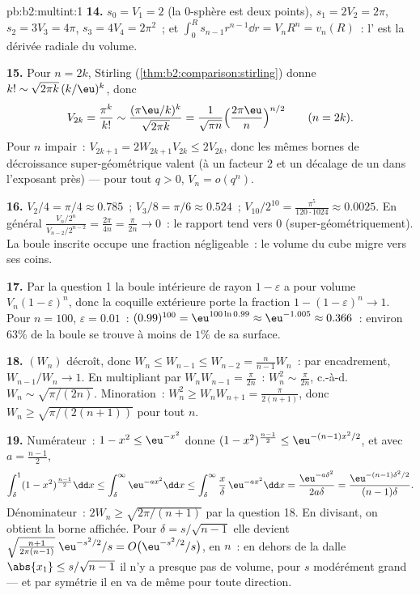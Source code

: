 \begin{solution}{pb:b2:multint:1}
\textbf{14.} $s_0 = V_1 = 2$ (la $0$-sphère est deux points),
$s_1 = 2V_2 = 2\pi$, $s_2 = 3V_3 = 4\pi$, $s_3 = 4V_4 =
2\pi^2$~; et $\int_0^R s_{n-1}r^{n-1}\dd r = V_nR^n =
v_n(R)$~: l' est la dérivée radiale du volume.

\textbf{15.} Pour $n = 2k$, Stirling
(\cref{thm:b2:comparison:stirling}) donne $k! \sim
\sqrt{2\pi k}\,(k/\eu)^k$, donc
\[
V_{2k} = \frac{\pi^k}{k!}
\sim \frac{(\pi\eu/k)^k}{\sqrt{2\pi k}}
= \frac1{\sqrt{\pi n}}\Bigl(\frac{2\pi\eu}n\Bigr)^{n/2}
\qquad (n = 2k).
\]
Pour $n$ impair~: $V_{2k+1} = 2W_{2k+1}V_{2k} \leq 2V_{2k}$, donc
les mêmes bornes de décroissance super-géométrique valent (à un facteur
$2$ et un décalage de un dans l'exposant près) --- pour tout $q >
0$, $V_n = o(q^n)$.

\textbf{16.} $V_2/4 = \pi/4 \approx 0.785$~; $V_3/8 = \pi/6
\approx 0.524$~; $V_{10}/2^{10} = \frac{\pi^5}{120\cdot1024}
\approx 0.0025$. En général $\frac{V_n/2^n}{V_{n-2}/2^{n-2}}
= \frac{2\pi}{4n} = \frac{\pi}{2n} \to 0$~: le rapport tend vers
$0$ (super-géométriquement). La boule inscrite occupe une
fraction négligeable~: le volume du cube migre vers ses
coins.

\textbf{17.} Par la question 1 la boule intérieure de rayon $1 -
\varepsilon$ a pour volume $V_n(1-\varepsilon)^n$, donc la coquille
extérieure porte la fraction $1 - (1 - \varepsilon)^n \to 1$.
Pour $n = 100$, $\varepsilon = 0.01$~: $(0.99)^{100} =
\eu^{100\ln0.99} \approx \eu^{-1.005} \approx 0.366$~: environ
$63\%$ de la boule se trouve à moins de $1\%$ de sa surface.

\textbf{18.} $(W_n)$ décroît, donc $W_n \leq W_{n-1} \leq
W_{n-2} = \frac{n}{n-1}W_n$~: par encadrement, $W_{n-1}/W_n \to 1$.
En multipliant par $W_nW_{n-1} = \frac\pi{2n}$~: $W_n^2 \sim
\frac\pi{2n}$, c.-à-d.\ $W_n \sim \sqrt{\pi/(2n)}$. Minoration~:
$W_n^2 \geq W_nW_{n+1} = \frac{\pi}{2(n+1)}$, donc $W_n \geq
\sqrt{\pi/(2(n+1))}$ pour tout $n$.

\textbf{19.} Numérateur~: $1 - x^2 \leq \eu^{-x^2}$ donne $(1 -
x^2)^{\frac{n-1}2} \leq \eu^{-(n-1)x^2/2}$, et avec $a =
\frac{n-1}2$,
\[
\int_\delta^1(1 - x^2)^{\frac{n-1}2}\dd x
\leq \int_\delta^\infty\eu^{-ax^2}\dd x
\leq \int_\delta^\infty\frac x\delta\,\eu^{-ax^2}\dd x
= \frac{\eu^{-a\delta^2}}{2a\delta}
= \frac{\eu^{-(n-1)\delta^2/2}}{(n-1)\delta}.
\]
Dénominateur~: $2W_n \geq \sqrt{2\pi/(n+1)}$ par la question 18.
En divisant, on obtient la borne affichée. Pour $\delta =
s/\sqrt{n-1}$ elle devient
$\sqrt{\tfrac{n+1}{2\pi(n-1)}}\;\eu^{-s^2/2}/s = O\bigl(
\eu^{-s^2/2}/s\bigr)$,  en $n$~: en dehors de la dalle
$\abs{x_1} \leq s/\sqrt{n-1}$ il n'y a presque pas de volume, pour
$s$ modérément grand --- et par symétrie il en va de même pour
toute direction.


\end{solution}
